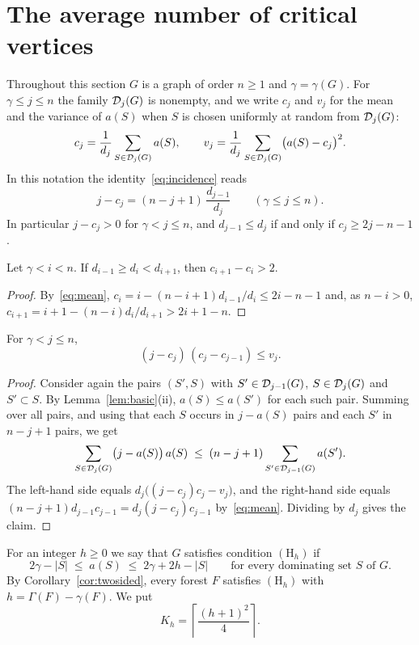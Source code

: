 \section{The average number of critical vertices}\label{sec:jump}

Throughout this section $G$ is a graph of order $n\ge1$ and
$\gamma=\gamma(G)$. For $\gamma\le j\le n$ the family $\mathcal{D}_j(G)$ is
nonempty, and we write $c_j$ and $v_j$ for the mean and the variance of
$a(S)$ when $S$ is chosen uniformly at random from $\mathcal{D}_j(G)$:
\[
  c_j=\frac1{d_j}\sum_{S\in\mathcal{D}_j(G)}a(S),\qquad
  v_j=\frac1{d_j}\sum_{S\in\mathcal{D}_j(G)}\bigl(a(S)-c_j\bigr)^2 .
\]
In this notation the identity~\eqref{eq:incidence} reads
\begin{equation}\label{eq:mean}
  j-c_j=(n-j+1)\,\frac{d_{j-1}}{d_j}\qquad(\gamma\le j\le n).
\end{equation}
In particular $j-c_j>0$ for $\gamma<j\le n$, and $d_{j-1}\le d_j$ if and only
if $c_j\ge 2j-n-1$.

\begin{lemma}\label{lem:valley}
Let $\gamma<i<n$. If $d_{i-1}\ge d_i<d_{i+1}$, then $c_{i+1}-c_i>2$.
\end{lemma}

\begin{proof}
By~\eqref{eq:mean}, $c_i=i-(n-i+1)d_{i-1}/d_i\le 2i-n-1$ and, as $n-i>0$,
$c_{i+1}=i+1-(n-i)d_i/d_{i+1}>2i+1-n$.
\end{proof}

\begin{lemma}\label{lem:cov}
For $\gamma<j\le n$,
\[
  (j-c_j)\,(c_j-c_{j-1})\le v_j .
\]
\end{lemma}

\begin{proof}
Consider again the pairs $(S',S)$ with $S'\in\mathcal{D}_{j-1}(G)$,
$S\in\mathcal{D}_j(G)$ and $S'\subset S$. By Lemma~\ref{lem:basic}(ii),
$a(S)\le a(S')$ for each such pair. Summing over all pairs, and using that
each $S$ occurs in $j-a(S)$ pairs and each $S'$ in $n-j+1$ pairs, we get
\[
  \sum_{S\in\mathcal{D}_j(G)}\bigl(j-a(S)\bigr)\,a(S)\;\le\;
  (n-j+1)\sum_{S'\in\mathcal{D}_{j-1}(G)}a(S') .
\]
The left-hand side equals $d_j\bigl((j-c_j)c_j-v_j\bigr)$, and the right-hand
side equals $(n-j+1)d_{j-1}c_{j-1}=d_j(j-c_j)c_{j-1}$ by~\eqref{eq:mean}.
Dividing by $d_j$ gives the claim.
\end{proof}

For an integer $h\ge0$ we say that $G$ satisfies condition $(\mathrm{H}_h)$ if
\begin{equation}\label{eq:H}
  2\gamma-|S|\;\le\;a(S)\;\le\;2\gamma+2h-|S|
  \qquad\text{for every dominating set $S$ of $G$.}
\end{equation}
By Corollary~\ref{cor:twosided}, every forest $F$ satisfies $(\mathrm{H}_h)$
with $h=\Gamma(F)-\gamma(F)$. We put
\[
  K_h=\left\lceil\frac{(h+1)^2}{4}\right\rceil .
\]

